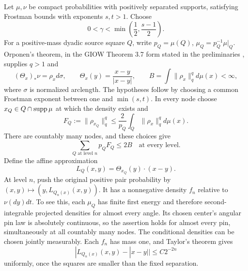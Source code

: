 Let \(\mu,\nu\) be compact probabilities with positively separated supports, satisfying Frostman bounds with exponents \(s,t>1\). Choose
$$
0<\gamma<\min\left(\frac12,\frac{s-1}{2}\right).
$$
For a positive-mass dyadic source square \(Q\), write \(p_Q=\mu(Q)\), \(\mu_Q=p_Q^{-1}\mu|_Q\). Orponen's theorem, in the GIOW Theorem 3.7 form stated in the preliminaries \cite{orponen,giow}, supplies \(q>1\) and
$$
(\Theta_x)_*\nu=\rho_xd\sigma,\qquad
\Theta_x(y)=\frac{x-y}{|x-y|},\qquad
B=\int\|\rho_x\|_q^q d\mu(x)<\infty,
$$
where \(\sigma\) is normalized arclength. The hypotheses follow by choosing a common Frostman exponent between one and \(\min(s,t)\). In every node choose \(x_Q\in Q\cap\operatorname{supp}\mu\) at which the density exists and
$$
F_Q:=\|\rho_{x_Q}\|_q^q\leq\frac2{p_Q}\int_Q\|\rho_x\|_q^q d\mu(x).
$$
There are countably many nodes, and these choices give
$$
\sum_{Q\text{ at level }n}p_QF_Q\leq2B
\quad\text{at every level.}
$$
Define the affine approximation
$$
L_Q(x,y)=\Theta_{x_Q}(y)\cdot(x-y).
$$
At level \(n\), push the original positive pair probability by \((x,y)\mapsto(y,L_{Q_n(x)}(x,y))\). It has a nonnegative density \(f_n\) relative to \(\nu(dy)dt\). To see this, each \(\mu_Q\) has finite first energy and therefore second-integrable projected densities for almost every angle. Its chosen center's angular pin law is absolutely continuous, so the assertion holds for almost every pin, simultaneously at all countably many nodes. The conditional densities can be chosen jointly measurably. Each \(f_n\) has mass one, and Taylor's theorem gives
$$
|L_{Q_n(x)}(x,y)-|x-y||\leq C2^{-2n}
$$
uniformly, once the squares are smaller than the fixed separation.

